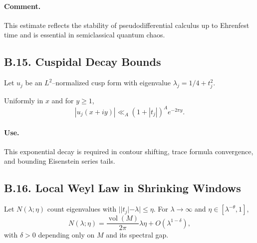 \paragraph{Comment.}
This estimate reflects the stability of pseudodifferential calculus up to
Ehrenfest time and is essential in semiclassical quantum chaos.

%

%
\subsection*{B.15. Cuspidal Decay Bounds}

Let $u_j$ be an $L^2$–normalized cusp form with eigenvalue $\lambda_j=1/4+t_j^2$.

\begin{lemma}\label{lem:B15}
Uniformly in $x$ and for $y\ge1$,
\[
  |u_j(x+iy)| \ll_A (1+|t_j|)^A e^{-2\pi y}.
\]
\end{lemma}

\paragraph{Use.}
This exponential decay is required in contour shifting,
trace formula convergence, and bounding Eisenstein series tails.

%

%
\subsection*{B.16. Local Weyl Law in Shrinking Windows}

\begin{theorem}\label{thm:B16}
Let $N(\lambda;\eta)$ count eigenvalues with $||t_j|-\lambda|\le\eta$.
For $\lambda\to\infty$ and $\eta\in[\lambda^{-\theta},1]$,
\[
  N(\lambda;\eta)=\frac{\operatorname{vol}(M)}{2\pi}\lambda\eta
  +O(\lambda^{1-\delta}),
\]
with $\delta>0$ depending only on $M$ and its spectral gap.
\end{theorem}

